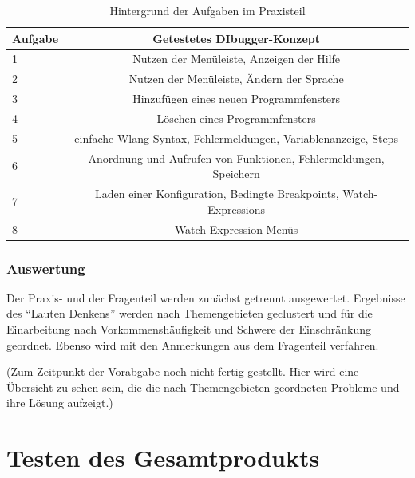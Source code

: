 \documentclass[parskip=full]{scrartcl}
\begin{document}
\begin{table}
\begin{tabular}{l||c}
   	Aufgabe & Getestetes DIbugger-Konzept \\
	\hline
	\hline
	1 & Nutzen der Menüleiste, Anzeigen der Hilfe\\
	2 & Nutzen der Menüleiste, Ändern der Sprache\\
	3 & Hinzufügen eines neuen Programmfensters \\
	4 & Löschen eines Programmfensters \\
	5 & einfache Wlang-Syntax, Fehlermeldungen, Variablenanzeige, Steps \\
	6 & Anordnung und Aufrufen von Funktionen, Fehlermeldungen, Speichern \\
	7 & Laden einer Konfiguration, Bedingte Breakpoints, Watch-Expressions \\
	8 & Watch-Expression-Menüs


\end{tabular}
\label{testfaelle}
\caption{Hintergrund der Aufgaben im Praxisteil}
\end{table}



\subsubsection{Auswertung}

Der Praxis- und der Fragenteil werden zunächst getrennt ausgewertet. Ergebnisse des \enquote{Lauten Denkens} werden nach Themengebieten geclustert und für die Einarbeitung nach Vorkommenshäufigkeit und Schwere der Einschränkung geordnet. Ebenso wird mit den Anmerkungen aus dem Fragenteil verfahren.

(Zum Zeitpunkt der Vorabgabe noch nicht fertig gestellt. Hier wird eine Übersicht zu sehen sein, die die nach Themengebieten geordneten Probleme und ihre Lösung aufzeigt.)






\newpage
\section{Testen des Gesamtprodukts}\label{gesamthwsw}

%
\end{document}
